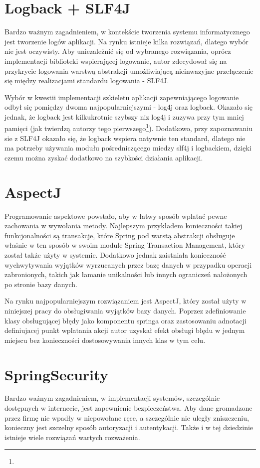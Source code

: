 \section{Logback + SLF4J}
Bardzo ważnym zagadnieniem, w kontekście tworzenia systemu informatycznego jest tworzenie logów aplikacji. Na rynku istnieje kilka rozwiązań, dlatego wybór nie jest oczywisty. Aby uniezależnić się od wybranego rozwiązania, oprócz implementacji biblioteki wspierającej logowanie, autor zdecydował się na przykrycie logowania warstwą abstrakcji umożliwiającą nieinwazyjne przełączenie się między realizacjami standardu logowania - SLF4J. 

Wybór w kwestii implementacji szkieletu aplikacji zapewniającego logowanie odbył się pomiędzy dwoma najpopularniejszymi - log4j oraz logback. Okazało się jednak, że logback jest kilkukrotnie szybszy niz log4j i zuzywa przy tym mniej pamięci (jak twierdzą autorzy tego pierwszego\footnote{}). Dodatkowo, przy zapoznawaniu sie z SLF4J okazało się, że logback wspiera natywnie ten standard, dlatego nie ma potrzeby używania modułu pośredniczącego miedzy slf4j i logbackiem, dzięki czemu można zyskać dodatkowo na szybkości działania aplikacji.

\section{AspectJ}
Programowanie aspektowe powstało, aby w łatwy sposób wplatać pewne zachowania w wywołania metody. Najlepszym przykładem konieczności takiej funkcjonalności są transakcje, które Spring pod warstą abstrakcji obsługuje właśnie w ten sposób w swoim module Spring Transaction Management, który został także użyty w systemie. Dodatkowo jednak zaistniała konieczność wychwytywania wyjątków wyrzucanych przez bazę danych w przypadku operacji zabronionych, takich jak łamanie unikalności lub innych ograniczeń nałożonych po stronie bazy danych.

\hrulefill\newline
{}

\newpage
Na rynku najpopularniejszym rozwiązaniem jest AspectJ, który został użyty w niniejszej pracy do obsługiwania wyjątków bazy danych. Poprzez zdefiniowanie klasy obsługującej błędy jako komponentu springa oraz zastosowaniu adnotacji definiujacej punkt wplatania akcji autor uzyskał efekt obsługi błędu w jednym miejscu bez konieczności dostosowywania innych klas w tym celu.

\section{SpringSecurity}
Bardzo ważnym zagadnieniem, w implementacji systemów, szczególnie dostępnych w internecie, jest zapewnienie bezpieczeństwa. Aby dane gromadzone przez firmę nie wpadły w niepowołane ręce, a szczególnie nie uległy zniszczeniu, konieczny jest szczelny sposób autoryzacji i autentykacji. Także i w tej dziedzinie istnieje wiele rozwiązań wartych rozważenia.

